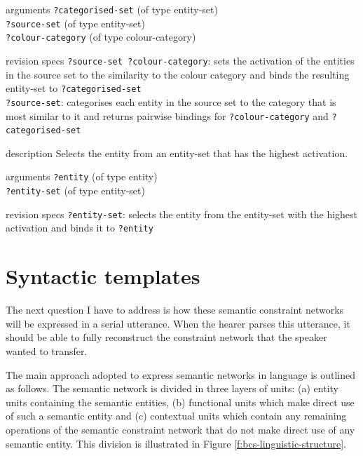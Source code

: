 \begin{explanation}{arguments}
\verb+?categorised-set+ (of type entity-set) \\
\verb+?source-set+ (of type entity-set) \\
\verb+?colour-category+ (of type colour-category)
\end{explanation}

\begin{explanation}{revision specs}
  \verb+?source-set ?colour-category+: sets the activation of the
  entities in the source set to the similarity to the colour category
  and binds the resulting entity-set to \verb+?categorised-set+ \\
  \verb+?source-set+: categorises each entity in the source set to the
  category that is most similar to it and returns pairwise bindings
  for \verb+?colour-category+ and \verb+?categorised-set+
\end{explanation}


\begin{explanation}{description}
Selects the entity from an entity-set that has the highest activation.
\end{explanation}

\begin{explanation}{arguments}
\verb+?entity+ (of type entity) \\
\verb+?entity-set+ (of type entity-set)
\end{explanation}

\begin{explanation}{revision specs}
\verb+?entity-set+: selects the entity from the entity-set with the highest activation and binds it to \verb+?entity+
\end{explanation}

\section{Syntactic templates}
\label{s:bcs-syntactic-templates}

The next question I have to address is how these semantic constraint
networks will be expressed in a serial utterance. When the hearer
parses this utterance, it should be able to fully reconstruct the
constraint network that the speaker wanted to transfer. 

The main approach adopted to express semantic networks in language is
outlined as follows. The semantic network is divided in three layers
of units: (a) entity units containing the semantic entities, (b)
functional units which make direct use of such a semantic entity and
(c) contextual units which contain any remaining operations of the
semantic constraint network that do not make direct use of any
semantic entity. This division is illustrated in Figure
\ref{f:bcs-linguistic-structure}.

